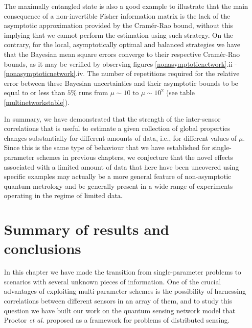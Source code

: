 The maximally entangled state is also a good example to illustrate that the main consequence of a non-invertible Fisher information matrix is the lack of the asymptotic approximation provided by the Cram\'{e}r-Rao bound, without this implying that we cannot perform the estimation using such strategy. On the contrary, for the local, asymptotically optimal and balanced strategies we have that the Bayesian mean square errors converge to their respective Cram\'{e}r-Rao bounds, as it may be verified by observing figures \ref{nonasymptoticnetwork}.ii - \ref{nonasymptoticnetwork}.iv. The number of repetitions required for the relative error between these Bayesian uncertainties and their asymptotic bounds to be equal to or less than $5\%$ runs from $\mu \sim 10$ to $\mu \sim 10^2$ (see table \ref{multinetworkstable}). 

In summary, we have demonstrated that the strength of the inter-sensor correlations that is useful to estimate a given collection of global properties changes substantially for different amounts of data, i.e., for different values of $\mu$. Since this is the same type of behaviour that we have established for single-parameter schemes in previous chapters, we conjecture that the novel effects associated with a limited amount of data that here have been uncovered using specific examples may actually be a more general feature of non-asymptotic quantum metrology and be generally present in a wide range of experiments operating in the regime of limited data.

\section{Summary of results and conclusions}

In this chapter we have made the transition from single-parameter problems to scenarios with several unknown pieces of information. One of the crucial advantages of exploiting multi-parameter schemes is the possibility of harnessing correlations between different sensors in an array of them, and to study this question we have built our work on the quantum sensing network model that Proctor \emph{et al.} \cite{proctor2017networked, proctor2017networkedshort} proposed as a framework for problems of distributed sensing. 

